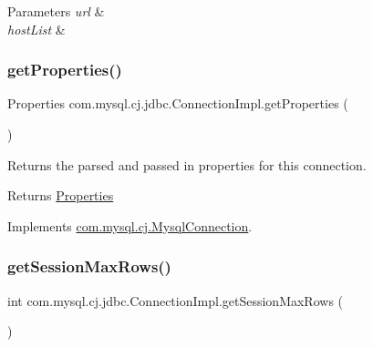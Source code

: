 \begin{DoxyParams}{Parameters}
{\em url} & \\
\hline
{\em host\+List} & \\
\hline
\end{DoxyParams}
\mbox{\label{classcom_1_1mysql_1_1cj_1_1jdbc_1_1_connection_impl_a63bb38c4e47986e5b187fb3fefb9aec6}} 
\subsubsection{\texorpdfstring{get\+Properties()}{getProperties()}}
{\footnotesize\ttfamily Properties com.\+mysql.\+cj.\+jdbc.\+Connection\+Impl.\+get\+Properties (\begin{DoxyParamCaption}{ }\end{DoxyParamCaption})}

Returns the parsed and passed in properties for this connection.

\begin{DoxyReturn}{Returns}
\mbox{\hyperlink{}{Properties}} 
\end{DoxyReturn}


Implements \mbox{\hyperlink{interfacecom_1_1mysql_1_1cj_1_1_mysql_connection_a1fde8714cc1e2176748fd4f35f0df0d1}{com.\+mysql.\+cj.\+Mysql\+Connection}}.

\mbox{\label{classcom_1_1mysql_1_1cj_1_1jdbc_1_1_connection_impl_ab5ca44f0832ea325d7b9d6acb8e2209c}} 
\subsubsection{\texorpdfstring{get\+Session\+Max\+Rows()}{getSessionMaxRows()}}
{\footnotesize\ttfamily int com.\+mysql.\+cj.\+jdbc.\+Connection\+Impl.\+get\+Session\+Max\+Rows (\begin{DoxyParamCaption}{ }\end{DoxyParamCaption})}

